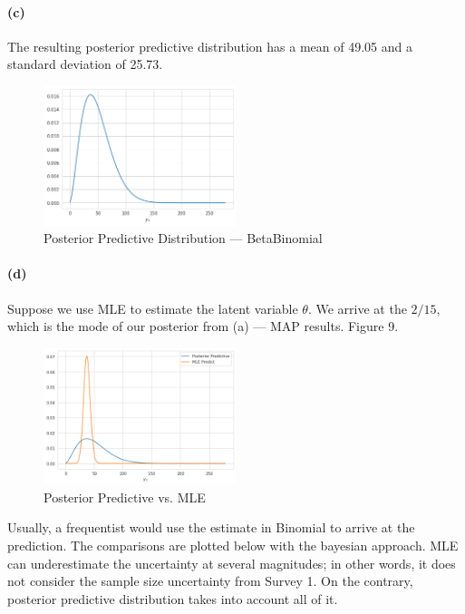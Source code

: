 \documentclass[11pt, letterpaper]{article}
\begin{document}
\paragraph{(c)}
The resulting posterior predictive distribution has a mean of 49.05 and a standard deviation of 25.73.

\begin{figure}[h]
    \captionsetup{justification=centering, margin=2cm}
    \centering
    \includegraphics[width=0.5\textwidth]{hw2_3.7.c.png}
    \caption{Posterior Predictive Distribution --- BetaBinomial}
\end{figure}

\paragraph{(d)}
Suppose we use MLE to estimate the latent variable $\theta$. We arrive at the $2/15$, which is the mode of our posterior
from (a) --- MAP results. Figure 9.

\begin{figure}[!h]
    \captionsetup{justification=centering, margin=2cm}
    \centering
    \includegraphics[width=0.5\textwidth]{hw2_3.7.d.png}
    \caption{Posterior Predictive vs. MLE}
\end{figure}

Usually, a frequentist would use the estimate in Binomial to arrive at the prediction. The comparisons
are plotted below with the bayesian approach. MLE can underestimate the uncertainty at several magnitudes; in
other words, it does not consider the sample size uncertainty from Survey 1. On the contrary, posterior predictive distribution
takes into account all of it.
\end{document}
